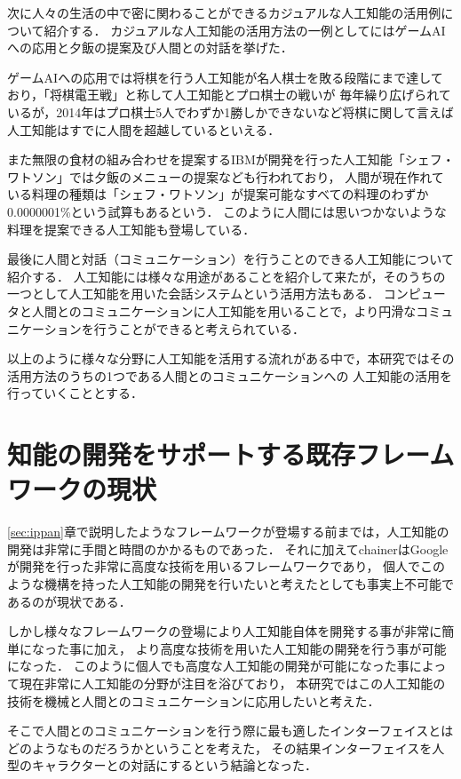 次に人々の生活の中で密に関わることができるカジュアルな人工知能の活用例について紹介する．
カジュアルな人工知能の活用方法の一例としてにはゲームAIへの応用と夕飯の提案及び人間との対話を挙げた．

ゲームAIへの応用では将棋を行う人工知能が名人棋士を敗る段階にまで達しており，「将棋電王戦」と称して人工知能とプロ棋士の戦いが
毎年繰り広げられているが，2014年はプロ棋士5人でわずか1勝しかできないなど将棋に関して言えば人工知能はすでに人間を超越しているといえる．

また無限の食材の組み合わせを提案するIBMが開発を行った人工知能「シェフ・ワトソン」では夕飯のメニューの提案なども行われており，
人間が現在作れている料理の種類は「シェフ・ワトソン」が提案可能なすべての料理のわずか0.0000001\%という試算もあるという．
このように人間には思いつかないような料理を提案できる人工知能も登場している．

最後に人間と対話（コミュニケーション）を行うことのできる人工知能について紹介する．
人工知能には様々な用途があることを紹介して来たが，そのうちの一つとして人工知能を用いた会話システムという活用方法もある．
コンピュータと人間とのコミュニケーションに人工知能を用いることで，より円滑なコミュニケーションを行うことができると考えられている．

以上のように様々な分野に人工知能を活用する流れがある中で，本研究ではその活用方法のうちの1つである人間とのコミュニケーションへの
人工知能の活用を行っていくこととする．

\section{知能の開発をサポートする既存フレームワークの現状}
\ref{sec:ippan}章で説明したようなフレームワークが登場する前までは，人工知能の開発は非常に手間と時間のかかるものであった．
それに加えてchainerはGoogleが開発を行った非常に高度な技術を用いるフレームワークであり，
個人でこのような機構を持った人工知能の開発を行いたいと考えたとしても事実上不可能であるのが現状である．

しかし様々なフレームワークの登場により人工知能自体を開発する事が非常に簡単になった事に加え，
より高度な技術を用いた人工知能の開発を行う事が可能になった．
このように個人でも高度な人工知能の開発が可能になった事によって現在非常に人工知能の分野が注目を浴びており，
本研究ではこの人工知能の技術を機械と人間とのコミュニケーションに応用したいと考えた．

そこで人間とのコミュニケーションを行う際に最も適したインターフェイスとはどのようなものだろうかということを考えた，
その結果インターフェイスを人型のキャラクターとの対話にするという結論となった．

